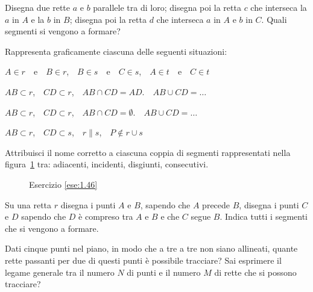 \begin{esercizio}
\label{ese:1.44}
Disegna due rette \(a\) e \(b\) parallele tra di loro; disegna poi la 
retta \(c\) che interseca la \(a\) in \(A\) e la \(b\) in \(B\); disegna poi la 
retta \(d\) che interseca \(a\) in \(A\) e \(b\) in \(C\). Quali segmenti si 
vengono a formare?
\end{esercizio}

\begin{esercizio}
\label{ese:1.45}
Rappresenta graficamente ciascuna delle seguenti situazioni:
\begin{enumeratea}
\item \(A\in r\)~~e~~\(B\in r\),~~\(B\in s\)~~e~~\(C\in s\),~~\(A\in 
t\)~~e~~\(C\in t\)
\item \(AB\subset r\),~~\(CD\subset r\),~~\(AB\cap CD=AD\).~~\(AB\cup 
CD=\ldots{}\)
\item \(AB\subset r\),~~\(CD\subset r\),~~\(AB\cap CD=\emptyset\).~~\(AB\cup 
CD=\ldots{}\)
\item \(AB\subset r\),~~\(CD\subset s\),~~\(r\parallel s\),~~\(P\notin r\cup 
s\)
\end{enumeratea}
\end{esercizio}

\begin{esercizio}
\label{ese:1.46}
Attribuisci il nome corretto a ciascuna coppia di segmenti 
rappresentati nella figura~\ref{fig:ese1.46} tra: adiacenti, 
incidenti, disgiunti, consecutivi.
\end{esercizio}


\begin{inaccessibleblock}
 \begin{figure}[htb]
 \centering
 \caption{Esercizio \ref{ese:1.46}}\label{fig:ese1.46}
\end{figure}
\end{inaccessibleblock}

\begin{esercizio}
\label{ese:1.47}
Su una retta \(r\) disegna i punti \(A\) e \(B\), sapendo che \(A\) precede 
\(B\), disegna i punti \(C\) e \(D\) sapendo che \(D\) è compreso tra \(A\) e 
\(B\) e che \(C\) segue \(B\). Indica tutti i segmenti che si vengono a 
formare.
\end{esercizio}

\begin{esercizio}
\label{ese:1.48}
Dati cinque punti nel piano, in modo che a tre a tre non siano 
allineati, quante rette passanti per due di questi punti è possibile 
tracciare? Sai esprimere il legame generale tra il numero \(N\) di 
punti e il numero \(M\) di rette che si possono tracciare?
\end{esercizio}

